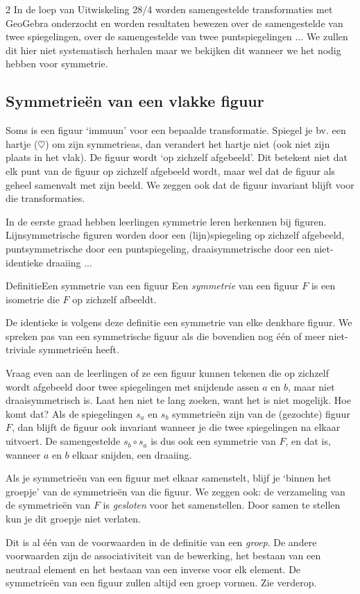 \begin{multicols}{2}
    In de loep van Uitwiskeling 28/4 worden samengestelde transformaties met GeoGebra onderzocht en worden resultaten bewezen over de samengestelde van twee spiegelingen, over de samengestelde van twee puntspiegelingen ... We zullen dit hier niet systematisch herhalen maar we bekijken dit wanneer we het nodig hebben voor symmetrie. 
	
	\subsection{Symmetrieën van een vlakke figuur}
	
	Soms is een figuur `immuun' voor een bepaalde transformatie. Spiegel je bv. een hartje ($\heartsuit$) om zijn symmetrieas, dan verandert het hartje niet (ook niet zijn plaats in het vlak). De figuur wordt `op zichzelf afgebeeld'. Dit betekent niet dat elk punt van de figuur op zichzelf afgebeeld wordt, maar wel dat de figuur als geheel samenvalt met zijn beeld. We zeggen ook dat de figuur invariant blijft voor die transformaties.
	
	In de eerste graad hebben leerlingen symmetrie leren herkennen bij figuren. Lijnsymmetrische figuren worden door een (lijn)spiegeling op zichzelf afgebeeld, puntsymmetrische door een puntspiegeling, draaisymmetrische door een niet-identieke draaiing ...
    \vspace{1cm}
	\begin{kader}{Definitie}{Een symmetrie van een figuur}
 	Een \emph{symmetrie} van een figuur $F$ is een isometrie die $F$ op zichzelf afbeeldt.
	\end{kader}
     \vspace{1cm}
	    De identieke is volgens deze definitie een symmetrie van elke denkbare figuur. We spreken pas van een symmetrische figuur als die bovendien nog één of meer niet-triviale symmetrieën heeft.

    Vraag even aan de leerlingen of ze een figuur kunnen tekenen die op zichzelf wordt afgebeeld door twee spiegelingen met snijdende assen $a$ en $b$, maar niet draaisymmetrisch is. Laat hen niet te lang zoeken, want het is niet mogelijk. Hoe komt dat? Als de spiegelingen $s_a$ en $s_b$ symmetrieën zijn van de (gezochte) figuur $F$, dan blijft de figuur ook invariant wanneer je die twee spiegelingen na elkaar uitvoert. De samengestelde $s_b\circ s_a$ is dus ook een symmetrie van $F$, en dat is, wanneer $a$ en $b$ elkaar snijden, een draaiing.
    
    Als je symmetrieën van een figuur met elkaar samenstelt, blijf je `binnen het groepje' van de symmetrieën van die figuur. We zeggen ook: de verzameling van de symmetrieën van $F$ is \emph{gesloten} voor het samenstellen. Door samen te stellen kun je dit groepje niet verlaten.
    
    Dit is al één van de voorwaarden in de definitie van een \emph{groep}. De andere voorwaarden zijn de associativiteit van de bewerking, het bestaan van een neutraal element en het bestaan van een inverse voor elk element. De symmetrieën van een figuur zullen altijd een groep vormen. Zie verderop.
\vspace{3cm}\\
\end{multicols}
	

